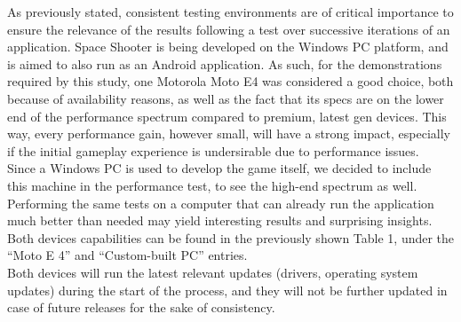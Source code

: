 As previously stated, consistent testing environments are of critical importance to ensure the relevance of the results following a test over successive iterations of an application. Space Shooter is being developed on the Windows PC platform, and is aimed to also run as an Android application. As such, for the demonstrations required by this study, one Motorola Moto E4 was considered a good choice, both because of availability reasons, as well as the fact that its specs are on the lower end of the performance spectrum compared to premium, latest gen devices. This way, every performance gain, however small, will have a strong impact, especially if the initial gameplay experience is undersirable due to performance issues. \\
Since a Windows PC is used to develop the game itself, we decided to include this machine in the performance test, to see the high-end spectrum as well. Performing the same tests on a computer that can already run the application much better than needed may yield interesting results and surprising insights. Both devices capabilities can be found in the previously shown Table 1, under the ``Moto E 4'' and ``Custom-built PC'' entries. \\ 
Both devices will run the latest relevant updates (drivers, operating system updates) during the start of the process, and they will not be further updated in case of future releases for the sake of consistency. 